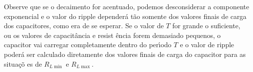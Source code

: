 \documentclass{article}
\begin{document}
\vspace{1pt}

Observe que se o decaimento for acentuado, podemos desconsiderar a
componente exponencial e o valor do ripple depender\'{a} t\~{a}o somente dos
valores finais de carga dos capacitores, como era de se esperar. Se o valor
de $T$ for grande o suficiente, ou os valores de capacit\^{a}ncia e resist%
\^{e}ncia forem demasiado pequenos, o capacitor vai carregar completamente
dentro do per\'{\i}odo $T$ e o valor de ripple poder\'{a} ser calculado
diretamente dos valores finais de carga do capacitor para as situa\c{c}\~{o}%
es de $R_{L\min }$ e $R_{L\max }$.

\vspace{1pt}

\vspace{1pt}


\vspace{1pt}

\vspace{1pt}

\vspace{1pt}

\vspace{1pt}

\vspace{1pt}

\vspace{1pt}

\vspace{1pt}

\vspace{1pt}

\vspace{1pt}

\vspace{1pt}

\vspace{1pt}

\vspace{1pt}

\vspace{1pt}

\vspace{1pt}

\vspace{1pt}

\vspace{1pt}

\vspace{1pt}

\vspace{1pt}

\vspace{1pt}
\end{document}
